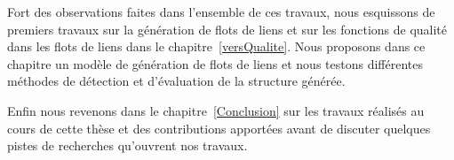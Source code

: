 Fort des observations faites dans l'ensemble de ces travaux, nous esquissons de premiers travaux sur la génération de flots de liens et sur les fonctions de qualité dans les flots de liens dans le chapitre~\ref{versQualite}.
Nous proposons dans ce chapitre un modèle de génération de flots de liens et nous testons différentes méthodes de détection et d'évaluation de la structure générée.


Enfin nous revenons dans le chapitre~\ref{Conclusion} sur les travaux réalisés au cours de cette thèse et des contributions apportées avant de discuter quelques pistes de recherches qu'ouvrent nos travaux.